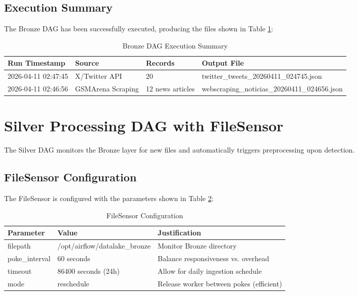 \documentclass[11pt,a4paper]{article}
\begin{document}
\subsection{Execution Summary}

The Bronze DAG has been successfully executed, producing the files shown in Table \ref{tab:bronze-executions}:

\begin{table}[H]
\centering
\begin{tabular}{l l l l}
\toprule
\textbf{Run Timestamp} & \textbf{Source} & \textbf{Records} & \textbf{Output File} \\
\midrule
2026-04-11 02:47:45 & X/Twitter API & 20 & twitter\_tweets\_20260411\_024745.json \\
2026-04-11 02:46:56 & GSMArena Scraping & 12 news articles & webscraping\_noticias\_20260411\_024656.json \\
\bottomrule
\end{tabular}
\caption{Bronze DAG Execution Summary}
\label{tab:bronze-executions}
\end{table}

\section{Silver Processing DAG with FileSensor}

The Silver DAG monitors the Bronze layer for new files and automatically triggers preprocessing upon detection.

\subsection{FileSensor Configuration}

The FileSensor is configured with the parameters shown in Table \ref{tab:filesensor}:

\begin{table}[H]
\centering
\begin{tabular}{>{\ttfamily}l l l}
\toprule
\textbf{Parameter} & \textbf{Value} & \textbf{Justification} \\
\midrule
filepath & /opt/airflow/datalake\_bronze & Monitor Bronze directory \\
poke\_interval & 60 seconds & Balance responsiveness vs. overhead \\
timeout & 86400 seconds (24h) & Allow for daily ingestion schedule \\
mode & reschedule & Release worker between pokes (efficient) \\
\bottomrule
\end{tabular}
\caption{FileSensor Configuration}
\label{tab:filesensor}
\end{table}
\end{document}
